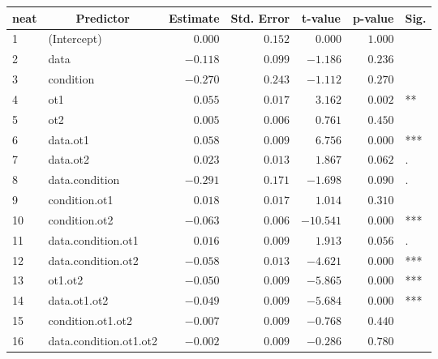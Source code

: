 \begin{table}[!tbp]
\begin{center}
\begin{tabular}{llrrrrl}
\hline\hline
\multicolumn{1}{l}{neat}&\multicolumn{1}{c}{Predictor}&\multicolumn{1}{c}{Estimate}&\multicolumn{1}{c}{Std. Error}&\multicolumn{1}{c}{t-value}&\multicolumn{1}{c}{p-value}&\multicolumn{1}{c}{Sig.}\tabularnewline
\hline
1&(Intercept)&$ 0.000$&$0.152$&$  0.000$&$1.000$& \tabularnewline
2&data&$-0.118$&$0.099$&$ -1.186$&$0.236$& \tabularnewline
3&condition&$-0.270$&$0.243$&$ -1.112$&$0.270$& \tabularnewline
4&ot1&$ 0.055$&$0.017$&$  3.162$&$0.002$&**\tabularnewline
5&ot2&$ 0.005$&$0.006$&$  0.761$&$0.450$& \tabularnewline
6&data.ot1&$ 0.058$&$0.009$&$  6.756$&$0.000$&***\tabularnewline
7&data.ot2&$ 0.023$&$0.013$&$  1.867$&$0.062$&.\tabularnewline
8&data.condition&$-0.291$&$0.171$&$ -1.698$&$0.090$&.\tabularnewline
9&condition.ot1&$ 0.018$&$0.017$&$  1.014$&$0.310$& \tabularnewline
10&condition.ot2&$-0.063$&$0.006$&$-10.541$&$0.000$&***\tabularnewline
11&data.condition.ot1&$ 0.016$&$0.009$&$  1.913$&$0.056$&.\tabularnewline
12&data.condition.ot2&$-0.058$&$0.013$&$ -4.621$&$0.000$&***\tabularnewline
13&ot1.ot2&$-0.050$&$0.009$&$ -5.865$&$0.000$&***\tabularnewline
14&data.ot1.ot2&$-0.049$&$0.009$&$ -5.684$&$0.000$&***\tabularnewline
15&condition.ot1.ot2&$-0.007$&$0.009$&$ -0.768$&$0.440$& \tabularnewline
16&data.condition.ot1.ot2&$-0.002$&$0.009$&$ -0.286$&$0.780$& \tabularnewline
\hline
\end{tabular}\end{center}
\end{table}
